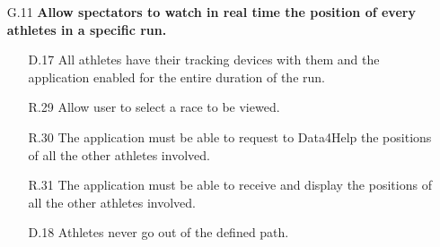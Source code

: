 \begin{enumerate}
\begin{enumerate}
	\item [G.11] \textbf{Allow spectators to watch in real time the position of every athletes in a specific run.}
		\begin{enumerate}
		\item [D.17] All athletes have their tracking devices with them and the application enabled for the entire duration of the run.	
		\item [R.29] Allow user to select a race to be viewed.
		\item [R.30] The application must be able to request to Data4Help the positions of all the other athletes involved.
		\item [R.31] The application must be able to receive and display the positions of all the other athletes involved.
		\item [D.18] Athletes never go out of the defined path.
		\end{enumerate}
	\end{enumerate}

\end{enumerate}

